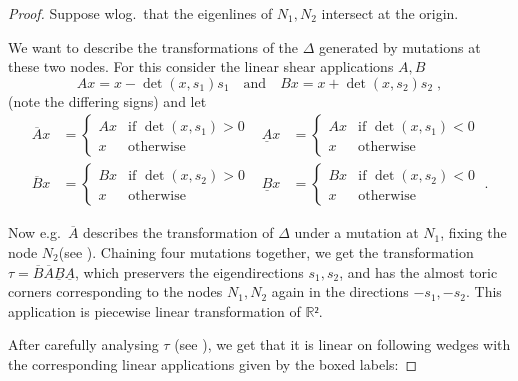\documentclass[12pt,a4paper,draft]{scrartcl}
\begin{document}
\begin{proof}
  Suppose wlog.\ that the eigenlines of $N_1,N_2$ intersect at the origin.

  We want to describe the transformations of the $Δ$ generated by mutations at these two nodes.
  For this consider the linear shear applications $A,B$
  \[Ax = x - \det(x,s_1) s_1 \quad \text{and} \quad Bx = x + \det(x,s_2) s_2 \; ,\]
  (note the differing signs) and let
  \begin{align*}
    \overline{A}x &= \begin{cases} Ax &\text{if } \det(x,s_1) > 0 \\ x &\text{otherwise } \end{cases}
                  &
    \underline{A}x &= \begin{cases} Ax &\text{if } \det(x,s_1) < 0 \\ x &\text{otherwise } \end{cases}
    \\
    \overline{B}x &= \begin{cases} Bx &\text{if } \det(x,s_2) > 0 \\ x &\text{otherwise } \end{cases}
                  &
    \underline{B}x &= \begin{cases} Bx &\text{if } \det(x,s_2) < 0 \\ x &\text{otherwise } \end{cases} \; .
  \end{align*}

  Now e.g.\ $\overline{A}$ describes the transformation of $Δ$ under a mutation at $N_1$, fixing the node $N_2$(see ).
  Chaining four mutations together, we get the transformation $τ = \overline{B} \overline{A} \underline{B} \underline{A}$, which preservers the eigendirections $s_1,s_2$, and has the almost toric corners corresponding to the nodes $N_1,N_2$ again in the directions $-s_1,-s_2$.
  This application is piecewise linear transformation of $ℝ²$.

  After carefully analysing $τ$ (see ), we get that it is linear on following wedges with the corresponding linear applications given by the boxed labels:



\end{proof}
\end{document}
